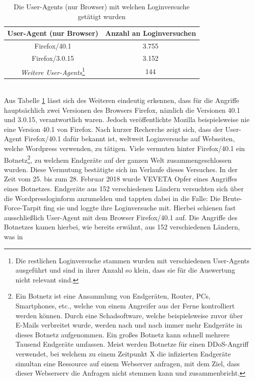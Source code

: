 \begin{table}[htb!]
	\centering
	\begin{tabular}{c|c}
		\textbf{User-Agent (nur Browser)}&\textbf{Anzahl an Loginversuchen}\\\hline
		Firefox/40.1 & 3.755 \\
		Firefox/3.0.15 & 3.152 \\
		\emph{Weitere User-Agents}\footnote{Die restlichen Loginversuche stammen wurden mit verschiedenen User-Agents ausgeführt und sind in ihrer Anzahl so klein, dass sie für die Auswertung nicht relevant sind.} & 144
	\end{tabular}
	\caption{Die User-Agents (nur Browser) mit welchen Loginversuche getätigt wurden}
	\label{tab:top-user-agent}
\end{table}
\\Aus Tabelle \ref{tab:top-user-agent} lässt sich des Weiteren eindeutig erkennen, dass für die Angriffe hauptsächlich zwei Versionen des Browsers Firefox, nämlich die Versionen 40.1 und 3.0.15, verantwortlich waren. Jedoch veröffentlichte Mozilla beispielsweise nie eine Version 40.1 von Firefox\cite{firefox-versions}. Nach kurzer Recherche zeigt sich, dass der User-Agent Firefox/40.1 dafür bekannt ist, weltweit Loginversuche auf Webseiten, welche Wordpress verwenden, zu tätigen\cite{firefox-40-1}. Viele vermuten hinter Firefox/40.1 ein Botnetz\footnote{Ein Botnetz ist eine Ansammlung von Endgeräten, Router, PCs, Smartphones, etc., welche von einem Angreifer aus der Ferne kontrolliert werden können. Durch eine Schadsoftware, welche beispielsweise zuvor über E-Mails verbreitet wurde, werden nach und nach immer mehr Endgeräte in dieses Botnetz aufgenommen. Ein großes Botnetz kann schnell mehrere Tausend Endgeräte umfassen. Meist werden Botnetze für einen DDoS-Angriff verwendet, bei welchem zu einem Zeitpunkt X die infizierten Endgeräte simultan eine Ressource auf einem Webserver anfragen, mit dem Ziel, dass dieser Webserserv die Anfragen nicht stemmen kann und zusammenbricht.}, zu welchem Endgeräte auf der ganzen Welt zusammengeschlossen wurden\cite{wordpress-botnetz}. Diese Vermutung bestätigte sich im Verlaufe dieses Versuches. In der Zeit vom 25. bis zum 28. Februar 2018 wurde VEVETA Opfer eines Angriffes eines Botnetzes. Endgeräte aus 152 verschiedenen Ländern versuchten sich über die Wordpressloginform anzumelden und tappten dabei in die Falle: Die Brute-Force-Tarpit fing sie und loggte ihre Loginversuche mit. Hierbei schienen fast ausschließlich User-Agent mit dem Browser Firefox/40.1 auf.\newpage
Die Angriffe des Botnetzes kamen hierbei, wie bereits erwähnt, aus 152 verschiedenen Ländern, was in 
